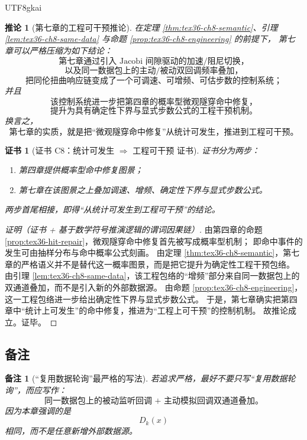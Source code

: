 \documentclass[12pt]{article}
\newtheorem{corollary}{推论}[section]
\newtheorem{remark}{备注}[section]
\newtheorem{Certificate}{证书}[section]
\begin{document}
\begin{CJK*}{UTF8}{gkai}
\begin{corollary}[第七章的工程可干预推论]
\label{cor:tex36-ch8-intervene}
在定理 \ref{thm:tex36-ch8-semantic}、引理 \ref{lem:tex36-ch8-same-data} 与命题 \ref{prop:tex36-ch8-engineering} 的前提下，
第七章可以严格压缩为如下结论：
\[
  \text{第七章通过引入 Jacobi 间隙驱动的加速/阻尼切换，}
\]
\[
  \text{以及同一数据包上的主动/被动双回调频率叠加，}
\]
\[
  \text{把同伦扭曲响应链变成了一个可调速、可增频、可估步数的控制系统；}
\]
并且
\[
  \text{该控制系统进一步把第四章的概率型微观隧穿命中修复，}
\]
\[
  \text{提升为具有确定性下界与显式步数公式的工程干预机制。}
\]
换言之，
\[
  \boxed{
    \text{第七章的实质，就是把“微观隧穿命中修复”从统计可发生，推进到工程可干预。}
  }
\]
\end{corollary}

\begin{Certificate}[证书 C8：统计可发生 $\Rightarrow$ 工程可干预 证书]
\label{cert:tex36-c8}
证书分为两步：
\begin{enumerate}
  \item 第四章提供概率型命中修复图景；
  \item 第七章在该图景之上叠加调速、增频、确定性下界与显式步数公式。
\end{enumerate}
两步首尾相接，即得“从统计可发生到工程可干预”的结论。
\end{Certificate}

\begin{proof}[证明（证书 + 基于数学符号推演逻辑的谓词因果链）]
由第四章的命题 \ref{prop:tex36-hit-repair}，微观隧穿命中修复首先被写成概率型机制；
即命中事件的发生可由抽样分布与命中概率公式刻画。
由定理 \ref{thm:tex36-ch8-semantic}，第七章的严格语义并不是替代这一概率图景，而是把它提升为确定性工程干预包络。
由引理 \ref{lem:tex36-ch8-same-data}，该工程包络的“增频”部分来自同一数据包上的双通道叠加，而不是引入新的外部数据源。
由命题 \ref{prop:tex36-ch8-engineering}，这一工程包络进一步给出确定性下界与显式步数公式。
于是，第七章确实把第四章中“统计上可发生”的命中修复，推进为“工程上可干预”的控制机制。
故推论成立。证毕。
\end{proof}

\subsection{备注}
\label{subsec:tex36-ch8-remarks}

\begin{remark}[“复用数据轮询”最严格的写法]
若追求严格，最好不要只写“复用数据轮询”，而应写作：
\[
  \text{同一数据包上的被动监听回调 + 主动模拟回调双通道叠加。}
\]
因为本章强调的是
\[
  D_k(x)
\]
相同，而不是任意新增外部数据源。
\end{remark}


\end{CJK*}
\end{document}
